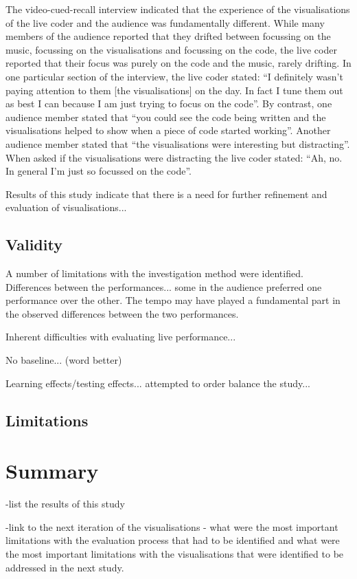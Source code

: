 The video-cued-recall interview indicated that the experience of the visualisations of the live coder and the audience was fundamentally different. While many members of the audience reported that they drifted between focussing on the music, focussing on the visualisations and focussing on the code, the live coder reported that their focus was purely on the code and the music, rarely drifting. In one particular section of the interview, the live coder stated: ``I definitely wasn't paying attention to them [the visualisations] on the day. In fact I tune them out as best I can because I am just trying to focus on the code''. By contrast, one audience member stated that ``you could see the code being written and the visualisations helped to show when a piece of code started working''. Another audience member stated that ``the visualisations were interesting but distracting''. When asked if the visualisations were distracting the live coder stated: ``Ah, no. In general I'm just so focussed on the code''.

Results of this study indicate that there is a need for further refinement and evaluation of visualisations... 

\subsection{Validity}

A number of limitations with the investigation method were identified. 
Differences between the performances... some in the audience preferred one performance over the other. The tempo may have played a fundamental part in the observed differences between the two performances.

Inherent difficulties with evaluating live performance...

No baseline... (word better)

Learning effects/testing effects... attempted to order balance the study...

\subsection{Limitations}


\section{Summary}

-list the results of this study

-link to the next iteration of the visualisations - what were the most important limitations with the evaluation process that had to be identified and what were the most important limitations with the visualisations that were identified to be addressed in the next study.

